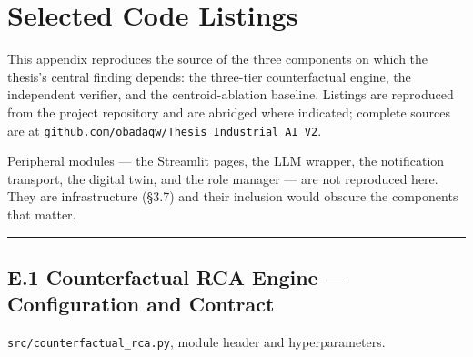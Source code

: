 \hypertarget{selected-code-listings}{%
\chapter{Selected Code Listings}\label{selected-code-listings}}

This appendix reproduces the source of the three components on which the thesis's central finding depends: the three-tier counterfactual engine, the independent verifier, and the centroid-ablation baseline. Listings are reproduced from the project repository and are abridged where indicated; complete sources are at \texttt{github.com/obadaqw/Thesis\_Industrial\_AI\_V2}.

Peripheral modules --- the Streamlit pages, the LLM wrapper, the notification transport, the digital twin, and the role manager --- are not reproduced here. They are infrastructure (§3.7) and their inclusion would obscure the components that matter.

\begin{center}\rule{0.5\linewidth}{0.5pt}\end{center}

\hypertarget{e.1-counterfactual-rca-engine-configuration-and-contract}{%
\section{E.1 Counterfactual RCA Engine --- Configuration and Contract}\label{e.1-counterfactual-rca-engine-configuration-and-contract}}

\texttt{src/counterfactual\_rca.py}, module header and hyperparameters.

